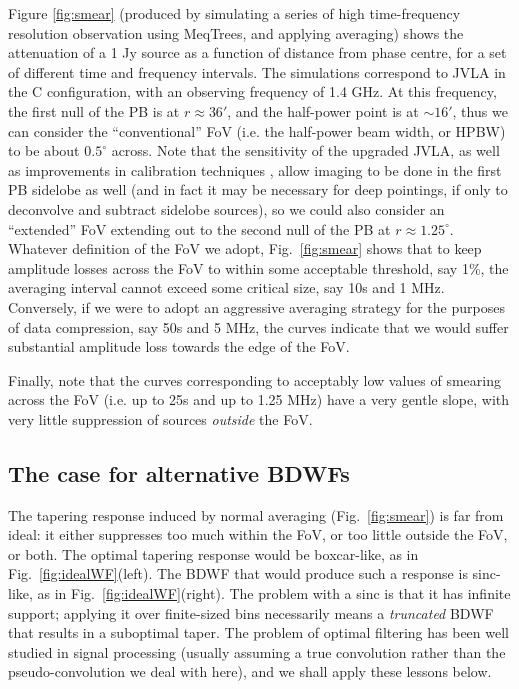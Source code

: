 \documentclass[useAMS,usenatbib]{mn2e}
\begin{document}
Figure \ref{fig:smear} (produced by simulating a series of high time-frequency resolution observation using MeqTrees, and 
applying averaging) shows the attenuation of a 1 Jy source as a function of distance
from phase centre, for a set of different time and frequency intervals. The simulations correspond to JVLA 
in the C configuration, with an observing frequency of 1.4 GHz. At this frequency, the first null of the PB is at 
$r\approx36'$, and the half-power point is at $\sim16'$, thus we can consider the ``conventional'' FoV (i.e. the half-power 
beam width, or HPBW) to be about $0.5^\circ$ across. Note that the sensitivity of the upgraded JVLA, as well as
improvements in calibration techniques \cite{Perley2013}, allow imaging to be done in the first PB sidelobe as well
(and in fact it may be necessary for deep pointings, if only to deconvolve and subtract sidelobe sources), so we could also
consider an ``extended'' FoV extending out to the second null of the PB at $r\approx1.25^\circ$. Whatever definition
of the FoV we adopt, Fig.~\ref{fig:smear} shows that to keep amplitude losses across
the FoV to within some acceptable threshold, say 1\%, the averaging interval cannot exceed some critical size,
say 10s and 1 MHz. Conversely, if we were to adopt an aggressive averaging strategy for the purposes of data 
compression, say 50s and 5 MHz, the curves indicate that we would suffer substantial amplitude loss towards the 
edge of the FoV. 

Finally, note that the curves corresponding to acceptably low values of smearing across the FoV (i.e. up to 25s and 
up to 1.25 MHz) have a very gentle slope, with very little suppression of sources \emph{outside} the FoV. 

\subsection{The case for alternative BDWFs}

The tapering response induced by normal averaging (Fig.~\ref{fig:smear}) is far from ideal: it either suppresses too much within 
the FoV, or too little outside the FoV, or both. The optimal tapering response would be boxcar-like, as in 
Fig.~\ref{fig:idealWF}(left). The BDWF that would produce such a response is sinc-like, as in Fig.~\ref{fig:idealWF}(right). 
The problem with a sinc is that it has infinite support; applying it over finite-sized bins necessarily means a \emph{truncated} 
BDWF that results in a suboptimal taper. The problem of optimal filtering has been well studied in signal processing (usually
assuming a true convolution rather than the pseudo-convolution we deal with here), and we shall apply these lessons below.
\end{document}
